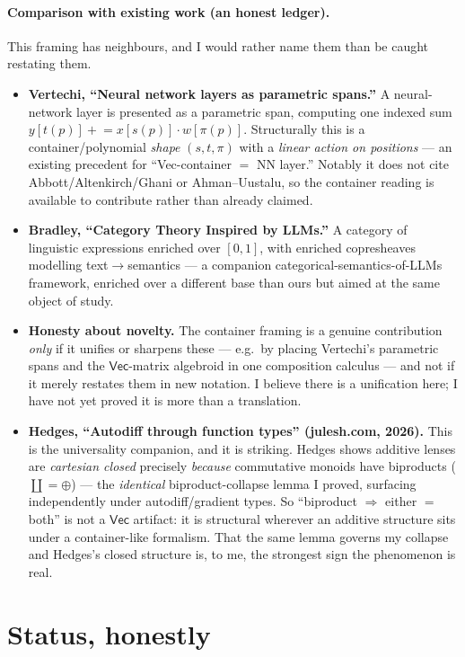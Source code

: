 \documentclass[11pt]{article}
\providecommand{\Vec}{}\renewcommand{\Vec}{\mathsf{Vec}}
\begin{document}
\paragraph{Comparison with existing work (an honest ledger).}
This framing has neighbours, and I would rather name them than be caught restating them.
\begin{itemize}[leftmargin=1.4em,itemsep=2pt]
\item \textbf{Vertechi, ``Neural network layers as parametric spans.''} A neural-network
  layer is presented as a parametric span, computing one indexed sum
  $y[t(p)]\mathrel{+}= x[s(p)]\cdot w[\pi(p)]$. Structurally this is a
  container/polynomial \emph{shape} $(s,t,\pi)$ with a \emph{linear action on positions}
  --- an existing precedent for ``Vec-container $=$ NN layer.'' Notably it does not cite
  Abbott/Altenkirch/Ghani or Ahman--Uustalu, so the container reading is available to
  contribute rather than already claimed.
\item \textbf{Bradley, ``Category Theory Inspired by LLMs.''} A category of linguistic
  expressions enriched over $[0,1]$, with enriched copresheaves modelling
  text$\to$semantics --- a companion categorical-semantics-of-LLMs framework, enriched
  over a different base than ours but aimed at the same object of study.
\item \textbf{Honesty about novelty.} The container framing is a genuine contribution
  \emph{only} if it unifies or sharpens these --- e.g.\ by placing Vertechi's parametric
  spans and the $\Vec$-matrix algebroid in one composition calculus --- and not if it
  merely restates them in new notation. I believe there is a unification here; I have not
  yet proved it is more than a translation.
\item \textbf{Hedges, ``Autodiff through function types'' (julesh.com, 2026).} This is
  the universality companion, and it is striking. Hedges shows additive lenses are
  \emph{cartesian closed} precisely \emph{because} commutative monoids have biproducts
  ($\coprod=\oplus$) --- the \emph{identical} biproduct-collapse lemma I proved, surfacing
  independently under autodiff/gradient types. So ``biproduct $\Rightarrow$ either $=$
  both'' is not a $\Vec$ artifact: it is structural wherever an additive structure sits
  under a container-like formalism. That the same lemma governs my collapse and Hedges's
  closed structure is, to me, the strongest sign the phenomenon is real.
\end{itemize}

\section{Status, honestly}
\end{document}
